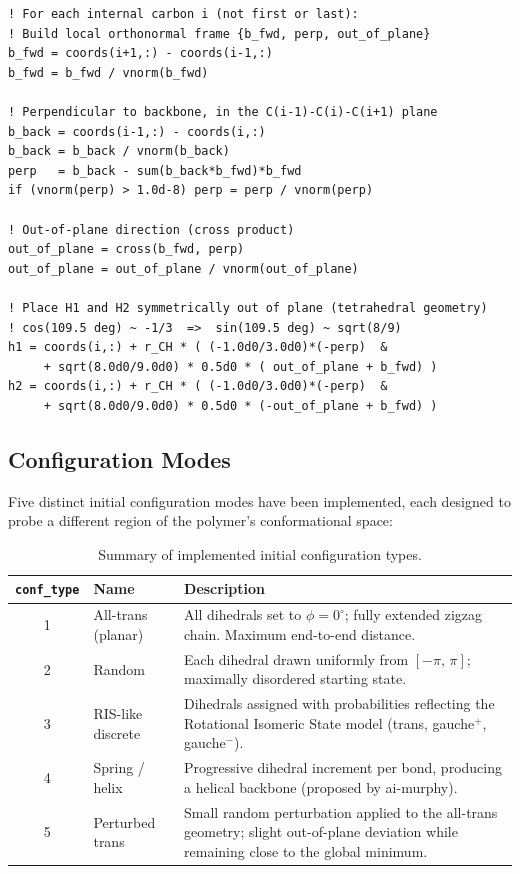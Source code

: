 \begin{lstlisting}[caption={Out-of-plane hydrogen placement for internal CH$_2$ groups.}]
! For each internal carbon i (not first or last):
! Build local orthonormal frame {b_fwd, perp, out_of_plane}
b_fwd = coords(i+1,:) - coords(i-1,:)
b_fwd = b_fwd / vnorm(b_fwd)

! Perpendicular to backbone, in the C(i-1)-C(i)-C(i+1) plane
b_back = coords(i-1,:) - coords(i,:)
b_back = b_back / vnorm(b_back)
perp   = b_back - sum(b_back*b_fwd)*b_fwd
if (vnorm(perp) > 1.0d-8) perp = perp / vnorm(perp)

! Out-of-plane direction (cross product)
out_of_plane = cross(b_fwd, perp)
out_of_plane = out_of_plane / vnorm(out_of_plane)

! Place H1 and H2 symmetrically out of plane (tetrahedral geometry)
! cos(109.5 deg) ~ -1/3  =>  sin(109.5 deg) ~ sqrt(8/9)
h1 = coords(i,:) + r_CH * ( (-1.0d0/3.0d0)*(-perp)  &
     + sqrt(8.0d0/9.0d0) * 0.5d0 * ( out_of_plane + b_fwd) )
h2 = coords(i,:) + r_CH * ( (-1.0d0/3.0d0)*(-perp)  &
     + sqrt(8.0d0/9.0d0) * 0.5d0 * (-out_of_plane + b_fwd) )
\end{lstlisting}

\subsection{Configuration Modes}

Five distinct initial configuration modes have been implemented, each designed
to probe a different region of the polymer's conformational space:

\begin{table}[h!]
\centering
\caption{Summary of implemented initial configuration types.}
\label{tab:conf_types}
\begin{tabular}{clp{9cm}}
\toprule
\texttt{conf\_type} & Name & Description \\
\midrule
1 & All-trans (planar) & All dihedrals set to $\phi = 0^\circ$; fully extended
                         zigzag chain. Maximum end-to-end distance. \\
2 & Random & Each dihedral drawn uniformly from $[-\pi,\,\pi]$; maximally
             disordered starting state. \\
3 & RIS-like discrete & Dihedrals assigned with probabilities reflecting the
                        Rotational Isomeric State model (trans, gauche$^+$,
                        gauche$^-$). \\
4 & Spring / helix & Progressive dihedral increment per bond, producing a
                     helical backbone (proposed by ai-murphy). \\
5 & Perturbed trans & Small random perturbation applied to the all-trans
                      geometry; slight out-of-plane deviation while remaining
                      close to the global minimum. \\
\bottomrule
\end{tabular}
\end{table}

